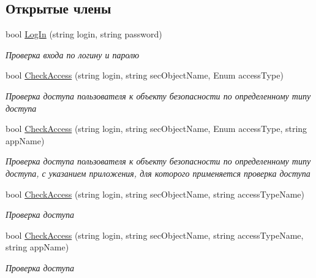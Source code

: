\subsection*{Открытые члены}
\begin{DoxyCompactItemize}
\item 
bool \hyperlink{interface_security_1_1_interfaces_1_1_i_security_a85a48460a5d327c495647539670049f8}{Log\+In} (string login, string password)
\begin{DoxyCompactList}\small\item\em Проверка входа по логину и паролю \end{DoxyCompactList}\item 
bool \hyperlink{interface_security_1_1_interfaces_1_1_i_security_ad996f672aeed3b4b889707c519e33ddc}{Check\+Access} (string login, string sec\+Object\+Name, Enum access\+Type)
\begin{DoxyCompactList}\small\item\em Проверка доступа пользователя к объекту безопасности по определенному типу доступа \end{DoxyCompactList}\item 
bool \hyperlink{interface_security_1_1_interfaces_1_1_i_security_abfc69f75a3d7510094fd41319f8b7c98}{Check\+Access} (string login, string sec\+Object\+Name, Enum access\+Type, string app\+Name)
\begin{DoxyCompactList}\small\item\em Проверка доступа пользователя к объекту безопасности по определенному типу доступа, с указанием приложения, для которого применяется проверка доступа \end{DoxyCompactList}\item 
bool \hyperlink{interface_security_1_1_interfaces_1_1_i_security_a8a405b7d7708713fb3ab8cb3b5eb4f11}{Check\+Access} (string login, string sec\+Object\+Name, string access\+Type\+Name)
\begin{DoxyCompactList}\small\item\em Проверка доступа \end{DoxyCompactList}\item 
bool \hyperlink{interface_security_1_1_interfaces_1_1_i_security_accc19c3e4a54d9dc283941295f8794f0}{Check\+Access} (string login, string sec\+Object\+Name, string access\+Type\+Name, string app\+Name)
\begin{DoxyCompactList}\small\item\em Проверка доступа \end{DoxyCompactList}\item 

\end{DoxyCompactItemize}
